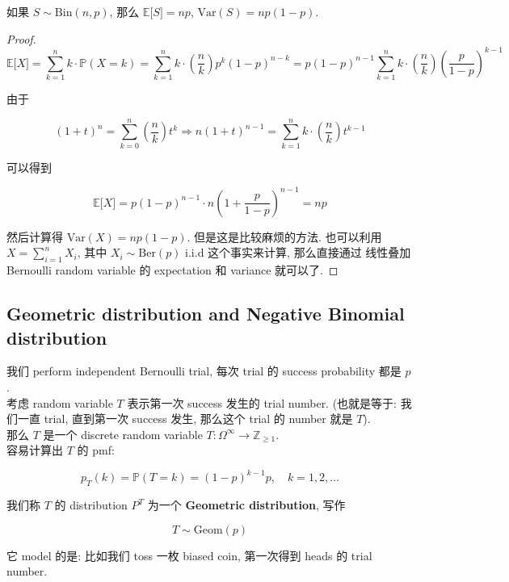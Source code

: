 \documentclass{qlnotes-export}
\begin{document}
\begin{proposition}

如果 \(S \sim \text{Bin}(n,p)\), 那么 \({\mathbb{E}}\lbrack S\rbrack = np\), \(\text{Var}(S) = np(1 - p)\).

\end{proposition}

\begin{proof}

\[{\mathbb{E}}\lbrack X\rbrack = \sum\limits_{k = 1}^{n}k \cdot {\mathbb{P}}(X = k) = \sum\limits_{k = 1}^{n}k \cdot \left( \frac{n}{k} \right)p^{k}(1 - p)^{n - k} = p(1 - p)^{n - 1}\sum\limits_{k = 1}^{n}k \cdot \left( \frac{n}{k} \right)(\frac{p}{1 - p})^{k - 1}\]

由于

\[(1 + t)^{n} = \sum\limits_{k = 0}^{n}\left( \frac{n}{k} \right)t^{k}\Longrightarrow n(1 + t)^{n - 1} = \sum\limits_{k = 1}^{n}k \cdot \left( \frac{n}{k} \right)t^{k - 1}\]

可以得到

\[{\mathbb{E}}\lbrack X\rbrack = p(1 - p)^{n - 1} \cdot n(1 + \frac{p}{1 - p})^{n - 1} = np\]

然后计算得 \(\text{Var}(X) = np(1 - p)\). 但是这是比较麻烦的方法. 也可以利用 \(X = \sum_{i = 1}^{n}X_{i}\), 其中 \(X_{i} \sim \text{Ber}(p)\) i.i.d 这个事实来计算, 那么直接通过 线性叠加 Bernoulli random variable 的 expectation 和 variance 就可以了.

\end{proof}

\subsection{Geometric distribution and Negative Binomial distribution}\label{geometric-distribution-and-negative-binomial-distribution}

\begin{example}

我们 perform independent Bernoulli trial, 每次 trial 的 success probability 都是 \(p\).\\
考虑 random variable \(T\) 表示第一次 success 发生的 trial number. (也就是等于: 我们一直 trial, 直到第一次 success 发生, 那么这个 trial 的 number 就是 \(T\)).\\
那么 \(T\) 是一个 discrete random variable \(T:\Omega^{\infty}\rightarrow{\mathbb{Z}}_{\geq 1}\).\\
容易计算出 \(T\) 的 pmf:

\[p_{T}(k) = {\mathbb{P}}(T = k) = (1 - p)^{k - 1}p,\quad k = 1,2,\ldots\]

我们称 \(T\) 的 distribution \(P^{T}\) 为一个 \textbf{Geometric distribution}, 写作

\[T \sim \text{Geom}(p)\]

它 model 的是: 比如我们 toss 一枚 biased coin, 第一次得到 heads 的 trial number.\\

\end{example}
\end{document}

